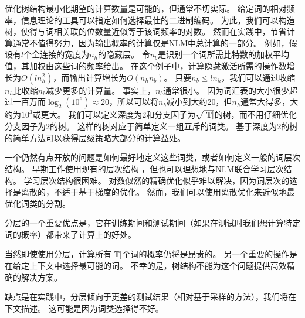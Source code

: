 优化树结构最小化期望的计算数量是可能的，但通常不切实际。
给定词的相对频率，信息理论的工具可以指定如何选择最佳的二进制编码。
为此，我们可以构造树，使得与词相关联的位数量近似等于该词频率的对数。
然而在实践中，节省计算通常不值得努力，因为输出概率的计算仅是\gls{NLM}中总计算的一部分。
例如，假设有$l$个全连接的宽度为$n_h$的隐藏层。
令$n_b$是识别一个词所需比特数的加权平均值，其加权由这些词的频率给出。
在这个例子中，计算隐藏激活所需的操作数增长为$O(ln_h^2)$，而输出计算增长为$O(n_h n_b)$。
只要$ n_b \leq l n_h$，我们可以通过收缩$n_h$比收缩$n_b$减少更多的计算量。
事实上，$n_b$通常很小。
因为词汇表的大小很少超过一百万而$\log_ 2(10^6) \approx 20$，所以可以将$n_b$减小到大约20，但$n_h$通常大得多，大约为$10^3$或更大。
我们可以定义深度为2和分支因子为$\sqrt{|\mathbb{T}|}$的树，而不用仔细优化分支因子为$2$的树。
这样的树对应于简单定义一组互斥的词类。
基于深度为$2$的树的简单方法可以获得层级策略大部分的计算益处。


一个仍然有点开放的问题是如何最好地定义这些词类，或者如何定义一般的词层次结构。
早期工作使用现有的层次结构\citep{Morin+Bengio-2005-small} ，但也可以理想地与\gls{NLM}联合学习层次结构。
学习层次结构很困难。
对数似然的精确优化似乎难以解决，因为词层次的选择是离散的，不适于基于梯度的优化。
然而，我们可以使用离散优化来近似地最优化词类的分割。

分层的一个重要优点是，它在训练期间和测试期间（如果在测试时我们想计算特定词的概率）都带来了计算上的好处。

当然即使使用分层，计算所有$|\mathbb{T}|$个词的概率仍将是昂贵的。
另一个重要的操作是在给定上下文中选择最可能的词。
不幸的是，树结构不能为这个问题提供高效精确的解决方案。

缺点是在实践中，分层倾向于更差的测试结果（相对基于采样的方法），我们将在下文描述。
这可能是因为词类选择得不好。

